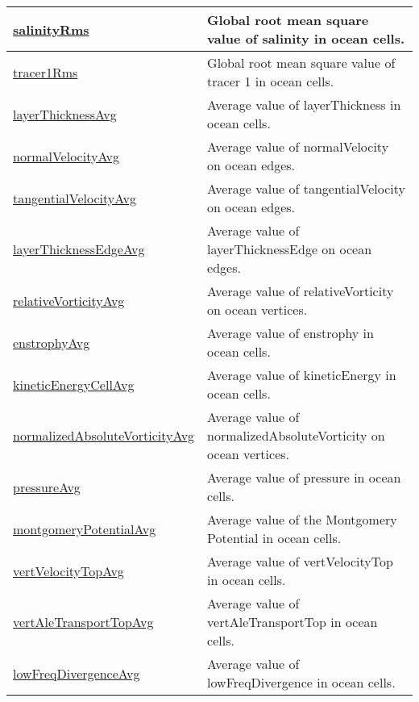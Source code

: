 {\begin{center}
\begin{longtable}{| p{2.0in} | p{4.0in} |}
	\hline
	\hyperref[subsec:var_sec_amGlobalStats_salinityRms]{salinityRms} & Global root mean square value of salinity in ocean cells. \\
	\hline
	\hyperref[subsec:var_sec_amGlobalStats_tracer1Rms]{tracer1Rms} & Global root mean square value of tracer 1 in ocean cells. \\
	\hline
	\hyperref[subsec:var_sec_amGlobalStats_layerThicknessAvg]{layerThicknessAvg} & Average value of layerThickness in ocean cells. \\
	\hline
	\hyperref[subsec:var_sec_amGlobalStats_normalVelocityAvg]{normalVelocityAvg} & Average value of normalVelocity on ocean edges. \\
	\hline
	\hyperref[subsec:var_sec_amGlobalStats_tangentialVelocityAvg]{tangentialVelocityAvg} & Average value of tangentialVelocity on ocean edges. \\
	\hline
	\hyperref[subsec:var_sec_amGlobalStats_layerThicknessEdgeAvg]{layerThicknessEdgeAvg} & Average value of layerThicknessEdge on ocean edges. \\
	\hline
	\hyperref[subsec:var_sec_amGlobalStats_relativeVorticityAvg]{relativeVorticityAvg} & Average value of relativeVorticity on ocean vertices. \\
	\hline
	\hyperref[subsec:var_sec_amGlobalStats_enstrophyAvg]{enstrophyAvg} & Average value of enstrophy in ocean cells. \\
	\hline
	\hyperref[subsec:var_sec_amGlobalStats_kineticEnergyCellAvg]{kineticEnergyCellAvg} & Average value of kineticEnergy in ocean cells. \\
	\hline
	\hyperref[subsec:var_sec_amGlobalStats_normalizedAbsoluteVorticityAvg]{normalizedAbsoluteVorticityAvg} & Average value of normalizedAbsoluteVorticity on ocean vertices. \\
	\hline
	\hyperref[subsec:var_sec_amGlobalStats_pressureAvg]{pressureAvg} & Average value of pressure in ocean cells. \\
	\hline
	\hyperref[subsec:var_sec_amGlobalStats_montgomeryPotentialAvg]{montgomeryPotentialAvg} & Average value of the Montgomery Potential in ocean cells. \\
	\hline
	\hyperref[subsec:var_sec_amGlobalStats_vertVelocityTopAvg]{vertVelocityTopAvg} & Average value of vertVelocityTop in ocean cells. \\
	\hline
	\hyperref[subsec:var_sec_amGlobalStats_vertAleTransportTopAvg]{vertAleTransportTopAvg} & Average value of vertAleTransportTop in ocean cells. \\
	\hline
	\hyperref[subsec:var_sec_amGlobalStats_lowFreqDivergenceAvg]{lowFreqDivergenceAvg} & Average value of lowFreqDivergence in ocean cells. \\

\end{longtable}
\end{center}}
